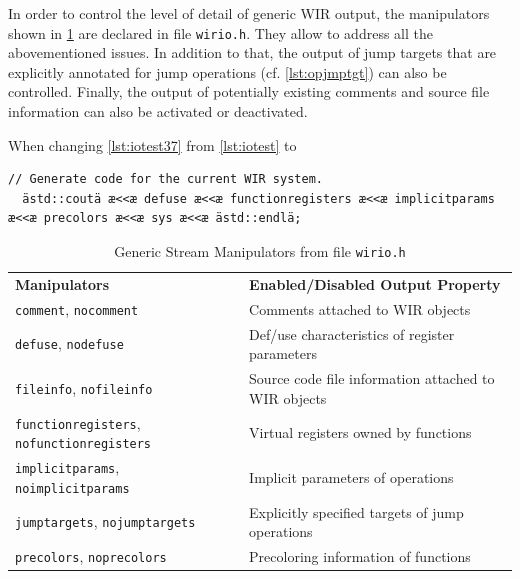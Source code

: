 In order to control the level of detail of generic \gls{WIR} output, the manipulators shown in \cref{tab:iomanip} are declared in file \texttt{wirio.h}.
They allow to address all the abovementioned issues.
In addition to that, the output of jump targets that are explicitly annotated for jump operations (cf. \cref{lst:opjmptgt}) can also be controlled.
Finally, the output of potentially existing comments and source file information can also be activated or deactivated.

When changing \cref{lst:iotest37} from \cref{lst:iotest} to

\begin{lstlisting}[style=code,float=h,firstnumber=55]
  // Generate code for the current WIR system.
  ästd::coutä æ<<æ defuse æ<<æ functionregisters æ<<æ implicitparams æ<<æ precolors æ<<æ sys æ<<æ ästd::endlä;
\end{lstlisting}

\begin{table}[t]
  \begin{center}
    \caption{Generic Stream Manipulators from file \texttt{wirio.h}}
    \label{tab:iomanip}
    \begin{tabular}{|l|p{9.2cm}|}
      \hline
      \textbf{Manipulators} & \textbf{Enabled/Disabled Output Property} \\
      \hhline{|=|=|}
      \texttt{comment}, \texttt{nocomment} & Comments attached to \gls{WIR} objects \\
      \hline
      \texttt{defuse}, \texttt{nodefuse} & Def/use characteristics of register parameters \\
      \hline
      \texttt{fileinfo}, \texttt{nofileinfo} & Source code file information attached to \gls{WIR} objects \\
      \hline
      \texttt{functionregisters}, \texttt{nofunctionregisters} & Virtual registers owned by functions \\
      \hline
      \texttt{implicitparams}, \texttt{noimplicitparams} & Implicit parameters of operations \\
      \hline
      \texttt{jumptargets}, \texttt{nojumptargets} & Explicitly specified targets of jump operations \\
      \hline
      \texttt{precolors}, \texttt{noprecolors} & Precoloring information of functions \\
      \hline
    \end{tabular}
  \end{center}
\end{table}

